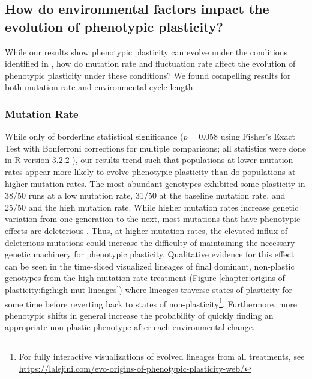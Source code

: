 

\begin{raggedright}
\subsection{How do environmental factors impact the evolution of phenotypic plasticity?}
\end{raggedright}

While our results show phenotypic plasticity can evolve under the conditions identified in \citep{ghalambor_behavior_2010}, how do mutation rate and fluctuation rate affect the evolution of phenotypic plasticity under these conditions? 
We found compelling results for both mutation rate and environmental cycle length. 
\vspace{0.25\baselineskip}

\subsubsection{Mutation Rate}

While only of borderline statistical significance ($p = 0.058$ using Fisher's Exact Test with Bonferroni corrections for multiple comparisons; all statistics were done in R version 3.2.2 \citep{r_core_team_2016}), our results trend such that populations at lower mutation rates appear more likely to evolve phenotypic plasticity than do populations at higher mutation rates. 
The most abundant genotypes exhibited some plasticity in 38/50 runs at a low mutation rate, 31/50 at the baseline mutation rate, and 25/50 and the high mutation rate.  
While higher mutation rates increase genetic variation from one generation to the next, most mutations that have phenotypic effects are deleterious \citep{sniegowski_evolution_2000}. 
Thus, at higher mutation rates, the elevated influx of deleterious mutations could increase the difficulty of maintaining the necessary genetic machinery for phenotypic plasticity.
Qualitative evidence for this effect can be seen in the time-sliced visualized lineages of final dominant, non-plastic genotypes from the high-mutation-rate treatment (Figure \ref{chapter:origins-of-plasticity:fig:high-mut-lineages}) where lineages traverse states of plasticity for some time before reverting back to states of non-plasticity\footnote{
For fully interactive visualizations of evolved lineages from all treatments, see \url{https://lalejini.com/evo-origins-of-phenotypic-plasticity-web/}
}.
Furthermore, more phenotypic shifts in general increase the probability of quickly finding an appropriate non-plastic phenotype after each environmental change.

